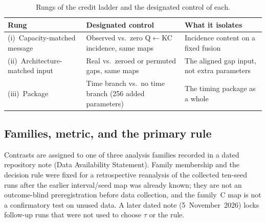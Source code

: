 \begin{table}[t]
\caption{Rungs of the credit ladder and the designated control of each.}
\label{tab:evidence-types}
\centering
\footnotesize
\begin{tabularx}{\textwidth}{@{}>{\raggedright\arraybackslash}p{3.2cm}
>{\raggedright\arraybackslash}p{5.0cm}
>{\raggedright\arraybackslash}X@{}}
\toprule
Rung & Designated control & What it isolates \\
\midrule
(i)~Capacity-matched message & Observed vs.\ zero Q$\leftarrow$KC
incidence, same maps & Incidence content on a fixed fusion \\
(ii)~Architecture-matched input & Real vs.\ zeroed or permuted gaps,
same maps & The aligned gap input, not extra parameters \\
(iii)~Package & Time branch vs.\ no time branch (256 added
parameters) & The timing package as a whole \\
\bottomrule
\end{tabularx}
\end{table}

\subsection{Families, metric, and the primary rule}
\label{sec:protocol-threshold}
Contrasts are assigned to one of three analysis families recorded in a
dated repository note
(Data Availability Statement). Family membership and the decision rule
were fixed for a retrospective reanalysis of the collected ten-seed
runs after the earlier interval/seed map was already known; they are
not an outcome-blind preregistration before data collection, and the
family~C map is not a confirmatory test on unused data. A later dated
note (5~November~2026) locks follow-up runs that were not used to
choose $\tau$ or the rule.

